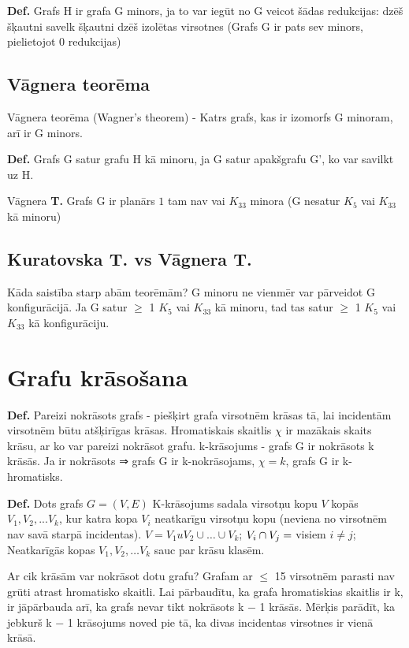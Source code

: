 \documentclass{article}
\begin{document}
\textbf{Def.}  Grafs H ir grafa G minors, ja to var iegūt no G veicot šādas redukcijas: dzēš šķautni savelk šķautni dzēš izolētas virsotnes (Grafs G ir pats sev minors, pielietojot 0 redukcijas)

\subsection{Vāgnera teorēma}

Vāgnera teorēma (Wagner's theorem) - Katrs grafs, kas ir izomorfs G minoram, arī ir G minors.

\textbf{Def.}  Grafs G satur grafu H kā minoru, ja G satur apakšgrafu G', ko var savilkt uz H.

Vāgnera \textbf{T. } Grafs G ir planārs $1$ tam nav vai $K_{33}$ minora (G nesatur $K_5$ vai $K_{33}$ kā minoru)

\subsection{Kuratovska \textbf{T. } vs Vāgnera \textbf{T. }}
Kāda saistība starp abām teorēmām?
G minoru ne vienmēr var pārveidot G konfigurācijā. Ja G satur $\ge$ 1 $K_5$ vai $K_{33}$ kā minoru, tad tas satur $\ge$ 1 $K_5$ vai $K_{33}$ kā konfigurāciju.

\section{Grafu krāsošana}

\textbf{Def.}  Pareizi nokrāsots grafs - piešķirt grafa virsotnēm krāsas tā, lai incidentām virsotnēm būtu atšķirīgas krāsas.  Hromatiskais skaitlis $\chi $ ir mazākais skaits krāsu, ar ko var pareizi nokrāsot grafu.  k-krāsojums - grafs G ir nokrāsots k krāsās. Ja ir nokrāsots ⇒ grafs G ir k-nokrāsojams, $\chi = k$, grafs G ir k-hromatisks.

\textbf{Def.}  Dots grafs $G = (V , E )$ K-krāsojums sadala virsotņu kopu $V$ kopās $V_1  , V_2 , ...V_k$, kur katra kopa $V_i$ neatkarīgu virsotņu kopu (neviena no virsotnēm nav savā starpā incidentas).  $V = V_1 u V_2 \cup \ldots \cup V_k$; $V_i \cap V_j = \empty$ visiem $i \ne j$; Neatkarīgās kopas $V_1 , V_2 , \ldots V_k$ sauc par krāsu klasēm.

Ar cik krāsām var nokrāsot dotu grafu?  Grafam ar $\le$ 15 virsotnēm parasti nav grūti atrast hromatisko skaitli.  Lai pārbaudītu, ka grafa hromatiskias skaitlis ir k, ir jāpārbauda arī, ka grafs nevar tikt nokrāsots k − 1 krāsās.  Mērķis parādīt, ka jebkurš k − 1 krāsojums noved pie tā, ka divas incidentas virsotnes ir vienā krāsā.
 
\end{document}
